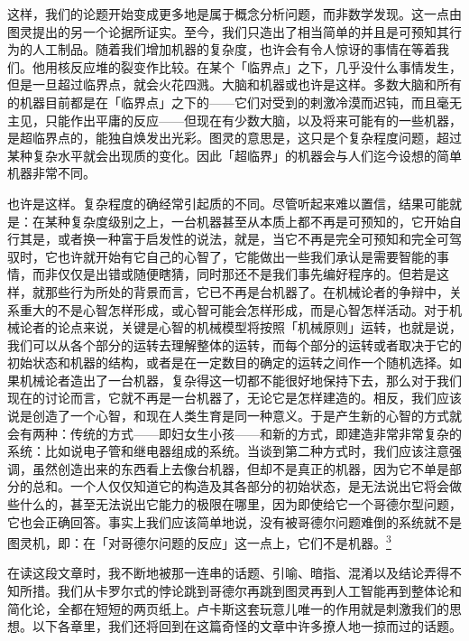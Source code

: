 \documentclass[
  12pt,
  twoside,
  openright,
  oldfontcommands,
]{memoir}
\newenvironment{fsquote}{%
  \begin{mdframed}[style=gebquote]\kaitifamily\small%
}{%
  \end{mdframed}%
}
\begin{document}
\begin{fsquote}
这样，我们的论题开始变成更多地是属于概念分析问题，而非数学发现。这一点由图灵提出的另一个论据所证实。至今，我们只造出了相当简单的并且是可预知其行为的人工制品。随着我们增加机器的复杂度，也许会有令人惊讶的事情在等着我们。他用核反应堆的裂变作比较。在某个「临界点」之下，几乎没什么事情发生，但是一旦超过临界点，就会火花四溅。大脑和机器或也许是这样。多数大脑和所有的机器目前都是在「临界点」之下的------它们对受到的剌激冷漠而迟钝，而且毫无主见，只能作出平庸的反应------但现在有少数大脑，以及将来可能有的一些机器，是超临界点的，能独自焕发出光彩。图灵的意思是，这只是个复杂程度问题，超过某种复杂水平就会出现质的变化。因此「超临界」的机器会与人们迄今设想的简单机器非常不同。
\end{fsquote}

\begin{fsquote}
也许是这样。复杂程度的确经常引起质的不同。尽管听起来难以置信，结果可能就是：在某种复杂度级别之上，一台机器甚至从本质上都不再是可预知的，它开始自行其是，或者换一种富于启发性的说法，就是，当它不再是完全可预知和完全可驾驭时，它也许就开始有它自己的心智了，它能做出一些我们承认是需要智能的事情，而非仅仅是出错或随便瞎猜，同时那还不是我们事先编好程序的。但若是这样，就那些行为所处的背景而言，它已不再是台机器了。在机械论者的争辩中，关系重大的不是心智怎样形成，或心智可能会怎样形成，而是心智怎样活动。对于机械论者的论点来说，关键是心智的机械模型将按照「机械原则」运转，也就是说，我们可以从各个部分的运转去理解整体的运转，而每个部分的运转或者取决于它的初始状态和机器的结构，或者是在一定数目的确定的运转之间作一个随机选择。如果机械论者造出了一台机器，复杂得这一切都不能很好地保持下去，那么对于我们现在的讨论而言，它就不再是一台机器了，无论它是怎样建造的。相反，我们应该说是创造了一个心智，和现在人类生育是同一种意义。于是产生新的心智的方式就会有两种：传统的方式------即妇女生小孩------和新的方式，即建造非常非常复杂的系统：比如说电子管和继电器组成的系统。当谈到第二种方式时，我们应该注意强调，虽然创造出来的东西看上去像台机器，但却不是真正的机器，因为它不单是部分的总和。一个人仅仅知道它的构造及其各部分的初始状态，是无法说出它将会做些什么的，甚至无法说出它能力的极限在哪里，因为即使给它一个哥德尔型问题，它也会正确回答。事实上我们应该简单地说，没有被哥德尔问题难倒的系统就不是图灵机，即：在「对哥德尔问题的反应」这一点上，它们不是机器。\hyperref[fn:Chapter12-3]{\textsuperscript{3}}
\end{fsquote}

在读这段文章时，我不断地被那一连串的话题、引喻、暗指、混淆以及结论弄得不知所措。我们从卡罗尔式的悖论跳到哥德尔再跳到图灵再到人工智能再到整体论和简化论，全都在短短的两页纸上。卢卡斯这套玩意儿唯一的作用就是刺激我们的思想。以下各章里，我们还将回到在这篇奇怪的文章中许多撩人地一掠而过的话题。
\end{document}
